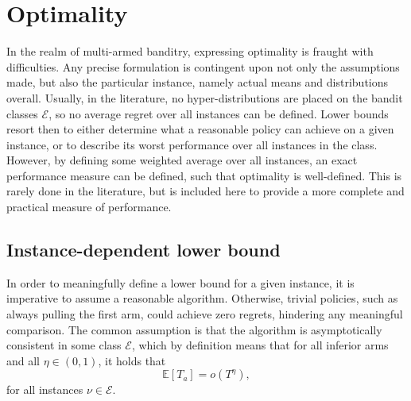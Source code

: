\section{Optimality}
\label{sec:optimality}
In the realm of multi-armed banditry, expressing optimality is fraught with difficulties.
Any precise formulation is contingent upon not only the assumptions made, but also the particular instance, namely actual means and distributions overall.
Usually, in the literature, no hyper-distributions are placed on the bandit classes $\mathcal{E}$, so no average regret over all instances can be defined.
Lower bounds resort then to either determine what a reasonable policy can achieve on a given instance, or to describe its worst performance over all instances in the class.
However, by defining some weighted average over all instances, an exact performance measure can be defined, such that optimality is well-defined.
This is rarely done in the literature, but is included here to provide a more complete and practical measure of performance.

\subsection{Instance-dependent lower bound}
In order to meaningfully define a lower bound for a given instance, it is imperative to assume a reasonable algorithm.
Otherwise, trivial policies, such as always pulling the first arm, could achieve zero regrets, hindering any meaningful comparison.
The common assumption is that the algorithm is asymptotically consistent in some class $\mathcal{E}$, which by definition means that for all inferior arms and all $\eta \in (0, 1)$, it holds that\footnotemark
\begin{equation}
    \mathbb{E}[T_a] = o(T^{\eta}),
\end{equation}
for all instances $\nu \in \mathcal{E}$.


